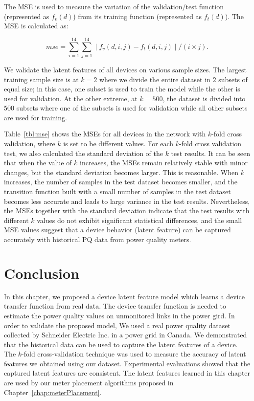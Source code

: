 The MSE is used to measure the variation of the validation/test function (represented as $f_v(d)$) from its training function (represented as $f_t(d)$).  The MSE is calculated as: 

\vspace{0.5cm}
\[mse = \sum_{i=1}^{14} \sum_{j=1}^{14} \mid f_v(d, i, j) - f_t(d, i, j) \mid / (i \times j).\]
\vspace{0.5cm}

We validate the latent features of all devices on various sample sizes. The largest training sample size is at $k=2$ where we divide the entire dataset in $2$ subsets of equal size; in this case, one subset is used to train the model while the other is used for validation. At the other extreme, at $k=500$, the dataset is divided into $500$ subsets where one of the subsets is used for validation while all other subsets are used for training.

Table~\ref{tbl:mse} shows the MSEs for all devices in the network with $k$-fold cross validation, where $k$ is set to be different values. For each $k$-fold cross validation test, we also calculated the standard deviation of the $k$ test results. It can be seen that when the value of $k$ increases, the MSEs remain relatively stable with minor changes, but the standard deviation becomes larger. This is reasonable. When $k$ increases, the number of samples in the test dataset becomes smaller, and the transition function built with a small number of samples in the test dataset becomes less accurate and leads to large variance in the test results. Nevertheless, the MSEs together with the standard deviation indicate that the test results with different $k$ values do not exhibit significant statistical differences, and the small MSE values suggest that a device behavior (latent feature) can be captured accurately with historical PQ data from power quality meters.

\vspace{0.5cm}
\section{Conclusion}
In this chapter, we proposed a device latent feature model which learns a device transfer function from real data. The device transfer function is needed to estimate the power quality values on unmonitored links in the power gird. In order to validate the proposed model, We used a real power quality dataset collected by Schneider Electric Inc. in a power grid in Canada. We demonstrated that the historical data can be used to capture the latent features of a device. The $k$-fold cross-validation technique was used to measure the accuracy of latent features we obtained using our dataset. Experimental evaluations showed that the captured latent features are consistent. The latent features learned in this chapter are used by our meter placement algorithms proposed in Chapter~\ref{chap:meterPlacement}.